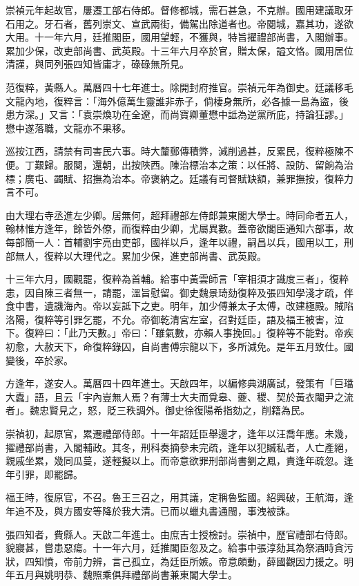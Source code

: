 \begin{pinyinscope}
崇禎元年起故官，屢遷工部右侍郎。督修都城，需石甚急，不克辦。國用建議取牙石用之。牙石者，舊列崇文、宣武兩街，備駕出除道者也。帝閱城，嘉其功，遂欲大用。十一年六月，廷推閣臣，國用望輕，不獲與，特旨擢禮部尚書，入閣辦事。累加少保，改吏部尚書、武英殿。十三年六月卒於官，贈太保，謚文恪。國用居位清謹，與同列張四知皆庸才，碌碌無所見。

范復粹，黃縣人。萬曆四十七年進士。除開封府推官。崇禎元年為御史。廷議移毛文龍內地，復粹言：「海外億萬生靈誰非赤子，倘棲身無所，必各據一島為盜，後患方深。」又言：「袁崇煥功在全遼，而尚寶卿董懋中詆為逆黨所庇，持論狂謬。」懋中遂落職，文龍亦不果移。

巡按江西，請禁有司害民六事。時大釐郵傳積弊，減削過甚，反累民，復粹極陳不便。丁艱歸。服闋，還朝，出按陜西。陳治標治本之策：以任將、設防、留餉為治標；廣屯、蠲賦、招撫為治本。帝褒納之。廷議有司督賦缺額，兼罪撫按，復粹力言不可。

由大理右寺丞進左少卿。居無何，超拜禮部左侍郎兼東閣大學士。時同命者五人，翰林惟方逢年，餘皆外僚，而復粹由少卿，尤屬異數。蓋帝欲閣臣通知六部事，故每部簡一人：首輔劉宇亮由吏部，國祥以戶，逢年以禮，嗣昌以兵，國用以工，刑部無人，復粹以大理代之。累加少保，進吏部尚書、武英殿。

十三年六月，國觀罷，復粹為首輔。給事中黃雲師言「宰相須才識度三者」，復粹恚，因自陳三者無一，請罷，溫旨慰留。御史魏景琦劾復粹及張四知學淺才疏，伴食中書，遺譏海內。帝以妄詆下之吏。明年，加少傅兼太子太傅，改建極殿。賊陷洛陽，復粹等引罪乞罷，不允。帝御乾清宮左室，召對廷臣，語及福王被害，泣下。復粹曰：「此乃天數。」帝曰：「雖氣數，亦賴人事挽回。」復粹等不能對。帝疾初愈，大赦天下，命復粹錄囚，自尚書傅宗龍以下，多所減免。是年五月致仕。國變後，卒於家。

方逢年，遂安人。萬曆四十四年進士。天啟四年，以編修典湖廣試，發策有「巨璫大蠹」語，且云「宇內豈無人焉？有薄士大夫而覓皋、夔、稷、契於黃衣閹尹之流者」。魏忠賢見之，怒，貶三秩調外。御史徐復陽希指劾之，削籍為民。

崇禎初，起原官，累遷禮部侍郎。十一年詔廷臣舉邊才，逢年以汪喬年應。未幾，擢禮部尚書，入閣輔政。其冬，刑科奏摘參未完疏，逢年以犯贓私者，人亡產絕，親戚坐累，幾同瓜蔓，遂輕擬以上。而帝意欲罪刑部尚書劉之鳳，責逢年疏忽。逢年引罪，即罷歸。

福王時，復原官，不召。魯王三召之，用其議，定稱魯監國。紹興破，王航海，逢年追不及，與方國安等降於我大清。已而以蠟丸書通閩，事洩被誅。

張四知者，費縣人。天啟二年進士。由庶吉士授檢討。崇禎中，歷官禮部右侍郎。貌寢甚，嘗患惡瘍。十一年六月，廷推閣臣忽及之。給事中張淳劾其為祭酒時貪污狀，四知憤，帝前力辨，言己孤立，為廷臣所嫉。帝意頗動，薛國觀因力援之。明年五月與姚明恭、魏照乘俱拜禮部尚書兼東閣大學士。


\end{pinyinscope}
